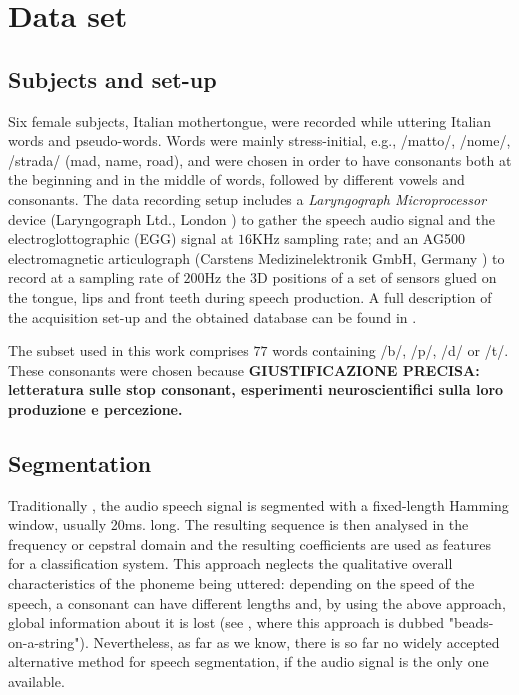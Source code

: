 \section{Data set}

\subsection{Subjects and set-up}
\label{subsec:setup}

Six female subjects, Italian mothertongue, were recorded while uttering
Italian words and pseudo-words. Words were mainly stress-initial, e.g.,
/matto/, /nome/, /strada/ (mad, name, road), and were chosen in order
to have consonants both at the beginning and in the middle of
words, followed by different vowels and consonants.
The data recording setup includes a \emph{Laryngograph Microprocessor}
device (Laryngograph Ltd., London \cite{...}) to gather the speech audio
signal and the electroglottographic (EGG) signal at $16$KHz sampling
rate; and an AG500 electromagnetic articulograph (Carstens Medizinelektronik
GmbH, Germany \cite{...}) to record at a sampling rate of $200$Hz the
3D positions of a set of sensors glued on the tongue, lips and front teeth
during speech production. A full description of the acquisition set-up and
the obtained database can be found in \cite{tavella}.

The subset used in this work comprises $77$ words containing /b/, /p/,
/d/ or /t/. These consonants were chosen because \textbf{GIUSTIFICAZIONE
PRECISA: letteratura sulle stop consonant, esperimenti neuroscientifici
sulla loro produzione e percezione.}

\subsection{Segmentation}
\label{subsec:segm}

Traditionally \cite{...}, the audio speech signal is segmented with a
fixed-length Hamming window, usually 20ms. long. The resulting sequence
is then analysed in the frequency or cepstral domain \cite{...} and the
resulting coefficients are used as features for a classification system.
This approach neglects the qualitative overall characteristics of the
phoneme being uttered: depending on the speed of the speech, a consonant
can have different lengths and, by using the above approach, global
information about it is lost (see \cite{...}, where this approach is
dubbed "beads-on-a-string"). Nevertheless, as far as we know, there is
so far no widely accepted alternative method for speech segmentation,
if the audio signal is the only one available.

